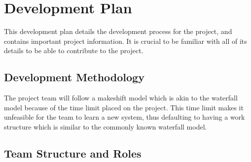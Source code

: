 \newpage
\section{Development Plan}
\label{section:development_plan}

This development plan details the development process for the project, and contains important project information. It is crucial to be familiar with all of its details to be able to contribute to the project.



\subsection{Development Methodology}

The project team will follow a makeshift model which is akin to the waterfall model because of the time limit placed on the project. This time limit makes it unfeasible for the team to learn a new system, thus defaulting to having a work structure which is similar to the commonly known waterfall model.



\subsection{Team Structure and Roles}

